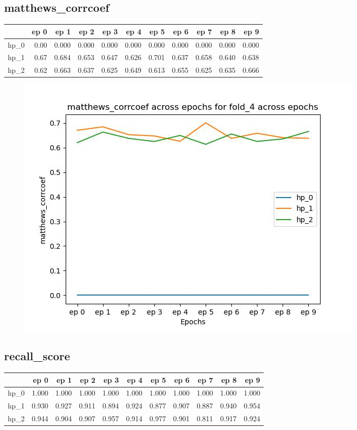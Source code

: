 \documentclass{article}
\begin{document}
\subsection{matthews\_corrcoef}
\begin{tabular}{lrrrrrrrrrr}
\toprule
{} &  ep 0 &   ep 1 &   ep 2 &   ep 3 &   ep 4 &   ep 5 &   ep 6 &   ep 7 &   ep 8 &   ep 9 \\
\midrule
hp\_0 &  0.00 &  0.000 &  0.000 &  0.000 &  0.000 &  0.000 &  0.000 &  0.000 &  0.000 &  0.000 \\
hp\_1 &  0.67 &  0.684 &  0.653 &  0.647 &  0.626 &  0.701 &  0.637 &  0.658 &  0.640 &  0.638 \\
hp\_2 &  0.62 &  0.663 &  0.637 &  0.625 &  0.649 &  0.613 &  0.655 &  0.625 &  0.635 &  0.666 \\
\bottomrule
\end{tabular}

\begin{figure}[H]
\includegraphics[scale = 0.75]{fold_4/matthews_corrcoef}
\end{figure}
\subsection{recall\_score}
\begin{tabular}{lrrrrrrrrrr}
\toprule
{} &   ep 0 &   ep 1 &   ep 2 &   ep 3 &   ep 4 &   ep 5 &   ep 6 &   ep 7 &   ep 8 &   ep 9 \\
\midrule
hp\_0 &  1.000 &  1.000 &  1.000 &  1.000 &  1.000 &  1.000 &  1.000 &  1.000 &  1.000 &  1.000 \\
hp\_1 &  0.930 &  0.927 &  0.911 &  0.894 &  0.924 &  0.877 &  0.907 &  0.887 &  0.940 &  0.954 \\
hp\_2 &  0.944 &  0.904 &  0.907 &  0.957 &  0.914 &  0.977 &  0.901 &  0.811 &  0.917 &  0.924 \\
\bottomrule
\end{tabular}
\end{document}

